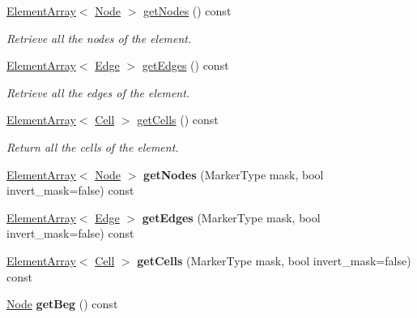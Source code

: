 \begin{DoxyCompactItemize}
\item 
\hyperlink{classINMOST_1_1ElementArray}{Element\-Array}$<$ \hyperlink{classINMOST_1_1Node}{Node} $>$ \hyperlink{classINMOST_1_1Face_a102ef5504795e2b3607093071259397e}{get\-Nodes} () const 
\begin{DoxyCompactList}\small\item\em Retrieve all the nodes of the element. \end{DoxyCompactList}\item 
\hyperlink{classINMOST_1_1ElementArray}{Element\-Array}$<$ \hyperlink{classINMOST_1_1Edge}{Edge} $>$ \hyperlink{classINMOST_1_1Face_aaf5b6793bec15dec905f198b2c46c912}{get\-Edges} () const 
\begin{DoxyCompactList}\small\item\em Retrieve all the edges of the element. \end{DoxyCompactList}\item 
\hyperlink{classINMOST_1_1ElementArray}{Element\-Array}$<$ \hyperlink{classINMOST_1_1Cell}{Cell} $>$ \hyperlink{classINMOST_1_1Face_a4c1a9d6300f0b8da3032753380a1846c}{get\-Cells} () const 
\begin{DoxyCompactList}\small\item\em Return all the cells of the element. \end{DoxyCompactList}\item 
\hypertarget{classINMOST_1_1Face_adfac7ba1a6dd2db5b2ef8fedee9663ed}{\hyperlink{classINMOST_1_1ElementArray}{Element\-Array}$<$ \hyperlink{classINMOST_1_1Node}{Node} $>$ {\bfseries get\-Nodes} (Marker\-Type mask, bool invert\-\_\-mask=false) const }\label{classINMOST_1_1Face_adfac7ba1a6dd2db5b2ef8fedee9663ed}

\item 
\hypertarget{classINMOST_1_1Face_ac8f705c1ac68aee4b2406123df50120a}{\hyperlink{classINMOST_1_1ElementArray}{Element\-Array}$<$ \hyperlink{classINMOST_1_1Edge}{Edge} $>$ {\bfseries get\-Edges} (Marker\-Type mask, bool invert\-\_\-mask=false) const }\label{classINMOST_1_1Face_ac8f705c1ac68aee4b2406123df50120a}

\item 
\hypertarget{classINMOST_1_1Face_a757b996ae899ef89a13fb076a34c0528}{\hyperlink{classINMOST_1_1ElementArray}{Element\-Array}$<$ \hyperlink{classINMOST_1_1Cell}{Cell} $>$ {\bfseries get\-Cells} (Marker\-Type mask, bool invert\-\_\-mask=false) const }\label{classINMOST_1_1Face_a757b996ae899ef89a13fb076a34c0528}

\item 
\hypertarget{classINMOST_1_1Face_a944a85186680ca168a45e323ad719d70}{\hyperlink{classINMOST_1_1Node}{Node} {\bfseries get\-Beg} () const }\label{classINMOST_1_1Face_a944a85186680ca168a45e323ad719d70}


\end{DoxyCompactItemize}
